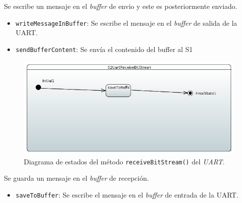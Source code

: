 Se escribe un mensaje en el \textit{buffer} de envio y este es posteriormente enviado.

\begin{itemize}
    \item \texttt{writeMessageInBuffer}: Se escribe el mensaje en el \textit{buffer} de salida de la UART.
    \item \texttt{sendBufferContent}: Se envía el contenido del buffer al \ac{S1}
\end{itemize}

\begin{figure}[H]
    \centering
    \includegraphics[width=1\linewidth]{pictures/S2UartReceiveBitStream.PNG}
    \caption{Diagrama de estados del método \texttt{receiveBitStream()} del \textit{UART}.}
    \label{fig:fun_receive_bit_stream_uart}
\end{figure}

Se guarda un mensaje en el \textit{buffer} de recepción.

\begin{itemize}
    \item \texttt{saveToBuffer}: Se escribe el mensaje en el \textit{buffer} de entrada de la UART.
\end{itemize}



